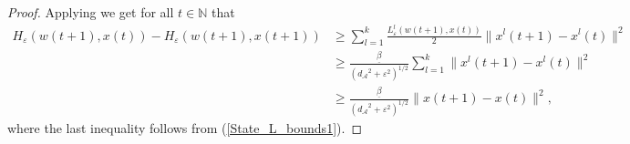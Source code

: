 \documentclass[11pt]{article}
\numberwithin{equation}{section}
\begin{document}
\begin{proof}
Applying  we get for all $t \in \mathbb{N}$ that
\begin{equation}
\begin{aligned}
	H_{\varepsilon}(w(t+1),x(t)) - H_{\varepsilon}(w(t+1),x(t+1)) 
	&\geq \sum\limits_{l=1}^{k} \frac{L^l_{\varepsilon}(w(t+1),x(t))}{2} \|x^l(t+1)-x^l(t)\|^2 \\
	&\geq \frac{\underline{\beta}}{\left( {d_{\mathcal{A}}}^2 + {\varepsilon}^2 \right)^{1/2}} \sum\limits _{l=1}^{k} \|x^l(t+1)-x^l(t)\|^2 \\
	&\geq \frac{\underline{\beta}}{\left( {d_{\mathcal{A}}}^2 + {\varepsilon}^2 \right)^{1/2}} \|x(t+1)-x(t)\|^2 , \label{StateEq39}
\end{aligned}
\end{equation}
where the last inequality follows from (\ref{State_L_bounds1}).
%

\end{proof}
\end{document}
